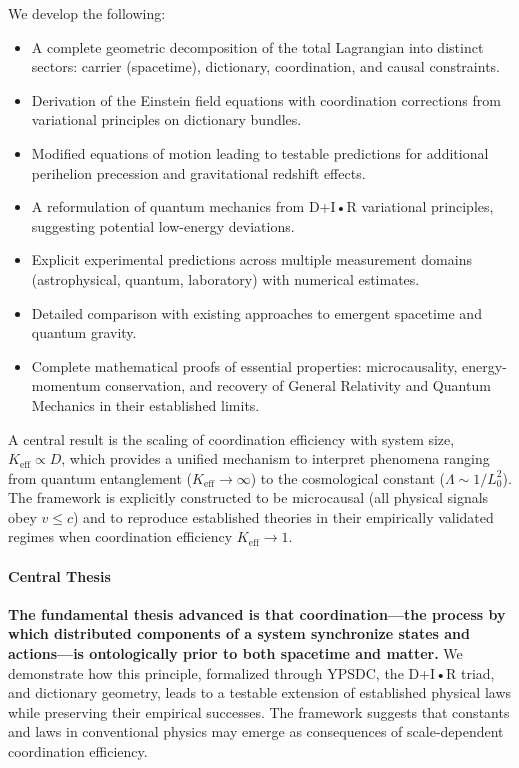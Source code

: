 \documentclass[11pt,a4paper]{article}
\begin{document}
We develop the following:
\begin{itemize}
	\item A complete geometric decomposition of the total Lagrangian into distinct sectors: carrier (spacetime), dictionary, coordination, and causal constraints.
	\item Derivation of the Einstein field equations with coordination corrections from variational principles on dictionary bundles.
	\item Modified equations of motion leading to testable predictions for additional perihelion precession and gravitational redshift effects.
	\item A reformulation of quantum mechanics from D+I•R variational principles, suggesting potential low-energy deviations.
	\item Explicit experimental predictions across multiple measurement domains (astrophysical, quantum, laboratory) with numerical estimates.
	\item Detailed comparison with existing approaches to emergent spacetime and quantum gravity.
	\item Complete mathematical proofs of essential properties: microcausality, energy-momentum conservation, and recovery of General Relativity and Quantum Mechanics in their established limits.
\end{itemize}

A central result is the scaling of coordination efficiency with system size, \(K_{\mathrm{eff}} \propto D\), which provides a unified mechanism to interpret phenomena ranging from quantum entanglement (\(K_{\mathrm{eff}} \to \infty\)) to the cosmological constant (\(\Lambda \sim 1/L_0^2\)). The framework is explicitly constructed to be microcausal (all physical signals obey \(v \leq c\)) and to reproduce established theories in their empirically validated regimes when coordination efficiency \(K_{\mathrm{eff}} \to 1\).

\paragraph{Central Thesis}
\textbf{The fundamental thesis advanced is that coordination---the process by which distributed components of a system synchronize states and actions---is ontologically prior to both spacetime and matter.} We demonstrate how this principle, formalized through YPSDC, the D+I•R triad, and dictionary geometry, leads to a testable extension of established physical laws while preserving their empirical successes. The framework suggests that constants and laws in conventional physics may emerge as consequences of scale-dependent coordination efficiency.
\end{document}
